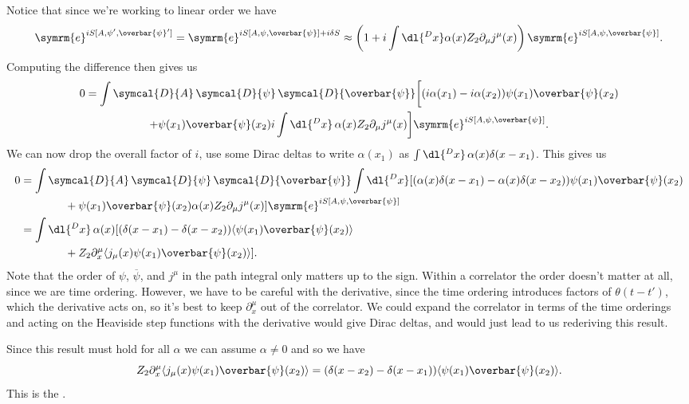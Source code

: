 \documentclass[fleqn]{NotesClass}
\newcommand{\e}{\symrm{e}}
\newcommand{\diracadjoint}[1]{\overbar{#1}}
\newcommand{\DL}[1]{\symcal{D}{#1}}
\newcommand{\DD}[1]{\,\symcal{D}{#1}}
\DeclarePairedDelimiter{\correlator}{\langle}{\rangle}
\begin{document}
    Notice that since we're working to linear order we have
    \begin{equation}
        \e^{iS[A, \psi', \diracadjoint{\psi}']} = \e^{iS[A, \psi, \diracadjoint{\psi}] + i\delta S} \approx \left( 1 + i\int \dl{^Dx} \alpha(x) Z_2 \partial_\mu j^\mu(x) \right) \e^{iS[A, \psi, \diracadjoint{\psi}]}.
    \end{equation}
    Computing the difference then gives us
    \begin{multline}
        0 = \int \DL{A} \DD{\psi} \DD{\diracadjoint{\psi}} \bigg[ (i\alpha(x_1) - i\alpha(x_2))\psi(x_1)\diracadjoint{\psi}(x_2)\\
        + \psi(x_1)\diracadjoint{\psi}(x_2) i \int \dl{^Dx} \, \alpha(x) Z_2 \partial_\mu j^\mu(x)  \bigg] \e^{iS[A, \psi, \diracadjoint{\psi}]}.
    \end{multline}
    We can now drop the overall factor of \(i\), use some Dirac deltas to write \(\alpha(x_1)\) as \(\int \dl{^Dx} \, \alpha(x) \delta(x - x_1)\).
    This gives us
    \begin{align}
        0 &= \int \DL{A} \DD{\psi} \DD{\diracadjoint{\psi}} \int \dl{^Dx} [ (\alpha(x)\delta(x - x_1) - \alpha(x)\delta(x - x_2))\psi(x_1)\diracadjoint{\psi}(x_2) \notag\\
        &\qquad\qquad+ \psi(x_1)\diracadjoint{\psi}(x_2) \alpha(x) Z_2 \partial_\mu j^\mu(x) ]\e^{iS[A, \psi, \diracadjoint{\psi}]}\\
        &= \int \dl{^Dx} \, \alpha(x) [(\delta(x - x_1) - \delta(x - x_2)) \correlator{\psi(x_1) \diracadjoint{\psi}(x_2)} \notag\\
        &\qquad\qquad + Z_2 \partial_x^\mu \correlator{j_\mu(x)\psi(x_1)\diracadjoint{\psi}(x_2)}].
    \end{align}
    Note that the order of \(\psi\), \(\diracadjoint{\psi}\), and \(j^\mu\) in the path integral only matters up to the sign.
    Within a correlator the order doesn't matter at all, since we are time ordering.
    However, we have to be careful with the derivative, since the time ordering introduces factors of \(\theta(t - t')\), which the derivative acts on, so it's best to keep \(\partial_x^\mu\) out of the correlator.
    We could expand the correlator in terms of the time orderings and acting on the Heaviside step functions with the derivative would give Dirac deltas, and would just lead to us rederiving this result.
    
    Since this result must hold for all \(\alpha\) we can assume \(\alpha \ne 0\) and so we have
    \begin{equation}
        Z_2 \partial_x^\mu \correlator{j_\mu(x) \psi(x_1) \diracadjoint{\psi}(x_2)} = (\delta(x - x_2) - \delta(x - x_1))\correlator{\psi(x_1)\diracadjoint{\psi}(x_2)}.
    \end{equation}
    This is the .
    
\end{document}
